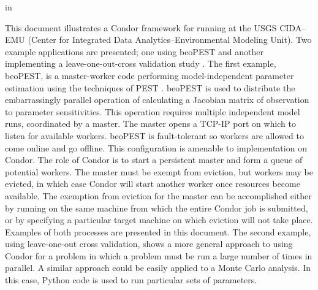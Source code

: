 \documentclass[11pt,twoside,onecolumn]{usgsreport}
\begin{document}

\setlength{\hfuzz}{12pt}
\makefrontmatter
\onecolumn
\setlength{\hfuzz}{0.1pt}

\pagestyle{body}
\RaggedRight
{} in

This document illustrates a Condor framework for running at the USGS CIDA--EMU (Center for Integrated Data Analytics--Environmental Modeling Unit). Two example applications are presented; one using beoPEST \citep{beoPEST} and another implementing a leave-one-out-cross validation study \citep{fishmodel} . \newline{}
The first example, beoPEST, is a master-worker code performing model-independent parameter estimation using the techniques of PEST \citep{PEST}. beoPEST is used to distribute the embarrassingly parallel operation of calculating a Jacobian matrix of observation to parameter sensitivities. This operation requires multiple independent model runs, coordinated by a master. The master opens a TCP-IP port on which to listen for available workers. beoPEST is fault-tolerant so workers are allowed to come online and go offline. This configuration is amenable to implementation on Condor. The role of Condor is to start a persistent master and form a queue of potential workers. The master must be exempt from eviction, but workers may be evicted, in which case Condor will start another worker once resources become available. The exemption from eviction for the master can be accomplished either by running on the same machine from which the entire Condor job is submitted, or by specifying a particular target machine on which eviction will not take place. Examples of both processes are presented in this document.\newline{}
The second example, using leave-one-out cross validation, shows a more general approach to using Condor for a problem in which a problem must be run a large number of times in parallel. A similar approach could be easily applied to a Monte Carlo analysis. In this case, Python code is used to run particular sets of parameters. 
\end{document}

